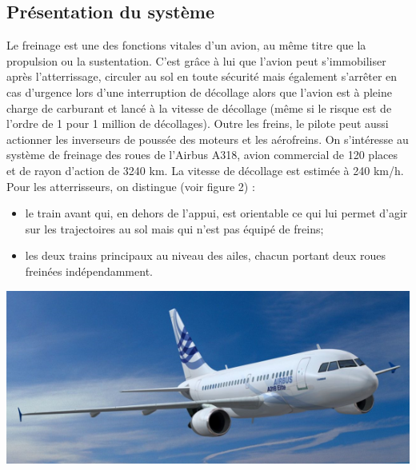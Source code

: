 \documentclass[10pt,fleqn]{article} %
\begin{document}
\begin{multicols}{2}
\section*{Présentation du système}
\ifprof
\else
Le freinage est une des fonctions vitales d’un avion, au même titre que la propulsion ou la sustentation. C’est grâce à lui que l’avion peut s’immobiliser après l’atterrissage, circuler
au sol en toute sécurité mais également s’arrêter en cas d’urgence lors d’une interruption de décollage alors que l’avion est à pleine charge de carburant et lancé à la vitesse de décollage (même si le risque est de l’ordre de 1 pour 1 million de décollages). Outre les freins, le pilote peut aussi actionner les inverseurs de poussée des moteurs et les aérofreins.
On s'intéresse au système de freinage des roues de l’Airbus A318, avion commercial de 120 places et de rayon d’action de 3240 km. La vitesse de décollage est estimée à 240 km/h. Pour
les atterrisseurs, on distingue (voir figure 2) :
\begin{itemize}
 \item  le train avant qui, en dehors de l’appui, est orientable ce qui lui permet d’agir sur les trajectoires au sol mais qui n’est pas équipé de freins;
\item les deux trains principaux au niveau des ailes, chacun portant deux roues freinées indépendamment. 
\end{itemize}

\begin{center}
\includegraphics[width=.85\linewidth]{images/image1.png}


\end{center}
\end{multicols}
\end{document}
